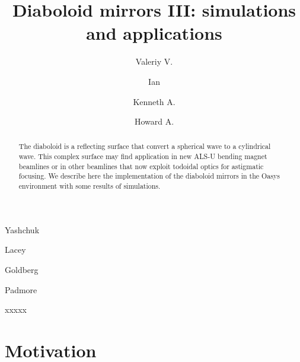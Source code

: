 \documentclass{iucr}              %
\begin{document}




\title{Diaboloid mirrors III: simulations and applications}

\author[a]{Valeriy V.}{Yashchuk}
\author[a]{Ian}{Lacey}
\author[a]{Kenneth A.}{Goldberg}
\author[a]{Howard A.}{Padmore}




\begin{synopsis}
xxxxx
\end{synopsis}

\begin{abstract}
The diaboloid is a reflecting surface that convert a spherical wave to a cylindrical wave. This complex surface may find application in new ALS-U bending magnet beamlines or in other  beamlines that now exploit todoidal optics for astigmatic focusing. We describe here the implementation of the diaboloid mirrors in the Oasys environment with some results of  simulations. 
\end{abstract}

\section{Motivation}

\end{document}
